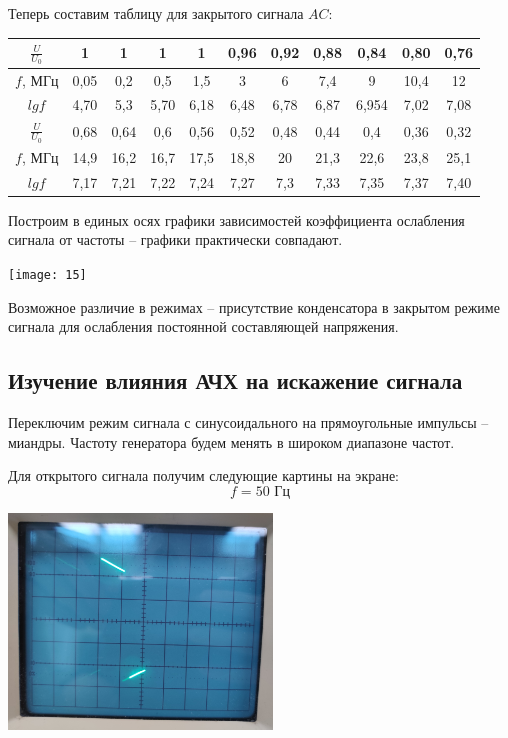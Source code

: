 \documentclass[a4paper, 12pt]{article} %
\begin{document}
Теперь составим таблицу для закрытого сигнала $AC$:\\

\begin{tabular}{|c|c|c|c|c|c|c|c|c|c|c|}
 \hline 
 $\frac{U}{U_0}$ & 1 & 1 & 1 & 1 & 0,96 & 0,92 & 0,88 & 0,84 & 0,80 & 0,76 \\ 
 \hline 
 $f$, МГц & 0,05 & 0,2 & 0,5 & 1,5 & 3 & 6 & 7,4 & 9 & 10,4 & 12 \\ 
 \hline
 $lgf$ & 4,70 & 5,3 & 5,70 & 6,18 & 6,48 & 6,78 & 6,87 & 6,954 & 7,02 & 7,08 \\  
 \hline 
 $\frac{U}{U_0}$ & 0,68 & 0,64 & 0,6 & 0,56 & 0,52 & 0,48 & 0,44 & 0,4 & 0,36 & 0,32 \\ 
 \hline 
 $f$, МГц & 14,9 & 16,2 & 16,7 & 17,5 & 18,8 & 20 & 21,3 & 22,6 & 23,8 & 25,1 \\ 
 \hline 
 $lgf$ & 7,17 & 7,21 & 7,22 & 7,24 & 7,27 & 7,3 & 7,33 & 7,35 & 7,37 & 7,40 \\  
 \hline
 \end{tabular}
 
\textbf{ }

Построим в единых осях графики зависимостей коэффициента ослабления сигнала от частоты -- графики практически совпадают.

\begin{center}
	\texttt{[image: 15]}
\end{center}

Возможное различие в режимах -- присутствие конденсатора в закрытом режиме сигнала для ослабления постоянной составляющей напряжения.\\


\subsection{Изучение влияния АЧХ на искажение сигнала}

Переключим режим сигнала с синусоидального на прямоугольные импульсы -- миандры. Частоту генератора будем менять в широком диапазоне частот.

Для открытого сигнала получим следующие картины на экране:
\[f = 50 \text{ Гц}\]

\begin{center}
	\includegraphics[width=7cm]{4}
\end{center}
\end{document}
